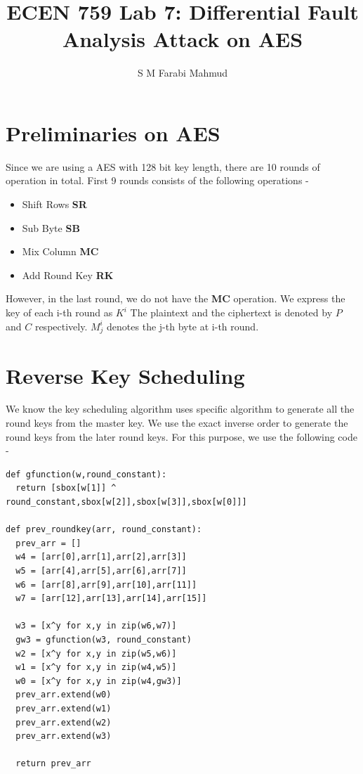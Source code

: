 \documentclass{article}
\title{ECEN 759 Lab 7: Differential Fault Analysis Attack on AES}
\author{S M Farabi Mahmud}
\begin{document}
\maketitle
\section{Preliminaries on AES}
Since we are using a AES with 128 bit key length, there are 10 rounds of operation in total. First 9 rounds consists of the following operations - 
\begin{itemize}
	\item Shift Rows \textbf{SR}
	\item Sub Byte \textbf{SB}
	\item Mix Column \textbf{MC}
	\item Add Round Key \textbf{RK}
\end{itemize}
However, in the last round, we do not have the \textbf{MC} operation. 
We express the key of each i-th round as $K^i$ The plaintext and the ciphertext is denoted by $P$ and $C$ respectively. $M^i_j$ denotes the j-th byte at i-th round. 

\section{Reverse Key Scheduling}
We know the key scheduling algorithm uses specific algorithm to generate all the round keys from the master key. We use the exact inverse order to generate the round keys from the later round keys. For this purpose, we use the following code - 
\begin{listing}[H]
	\begin{verbatim}
def gfunction(w,round_constant):
  return [sbox[w[1]] ^ round_constant,sbox[w[2]],sbox[w[3]],sbox[w[0]]]
	
def prev_roundkey(arr, round_constant):
  prev_arr = []
  w4 = [arr[0],arr[1],arr[2],arr[3]]
  w5 = [arr[4],arr[5],arr[6],arr[7]]
  w6 = [arr[8],arr[9],arr[10],arr[11]]
  w7 = [arr[12],arr[13],arr[14],arr[15]]

  w3 = [x^y for x,y in zip(w6,w7)]
  gw3 = gfunction(w3, round_constant)
  w2 = [x^y for x,y in zip(w5,w6)] 
  w1 = [x^y for x,y in zip(w4,w5)]
  w0 = [x^y for x,y in zip(w4,gw3)]
  prev_arr.extend(w0)
  prev_arr.extend(w1)
  prev_arr.extend(w2)
  prev_arr.extend(w3)

  return prev_arr

	\end{verbatim}
\end{listing}
\end{document}
